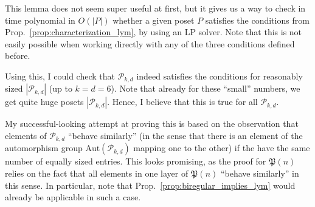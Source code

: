 \documentclass{scrartcl}
\newcommand{\powerset}{\mathfrak{P}}
\theoremstyle{definition}
\begin{document}
This lemma does not seem super useful at first, but it gives us a way to check in time polynomial in $O(|P|)$ whether a given poset $P$ satisfies the conditions from Prop.~\ref{prop:characterization_lym}, by using an LP solver.
Note that this is not easily possible when working directly with any of the three conditions defined before.

Using this, I could check that $\mathcal{P}_{k, d}$ indeed satisfies the conditions for reasonably sized $|\mathcal{P}_{k, d}|$ (up to $k = d = 6$).
Note that already for these ``small'' numbers, we get quite huge posets $|\mathcal{P}_{k, d}|$.
Hence, I believe that this is true for all $\mathcal{P}_{k, d}$.

My successful-looking attempt at proving this is based on the observation that elements of $\mathcal{P}_{k, d}$ ``behave similarly'' (in the sense that there is an element of the automorphism group $\mathrm{Aut}(\mathcal{P}_{k, d})$ mapping one to the other) if the have the same number of equally sized entries.
This looks promising, as the proof for $\powerset(n)$ relies on the fact that all elements in one layer of $\powerset(n)$ ``behave similarly'' in this sense.
In particular, note that Prop.~\ref{prop:biregular_implies_lym} would already be applicable in such a case.
\end{document}
